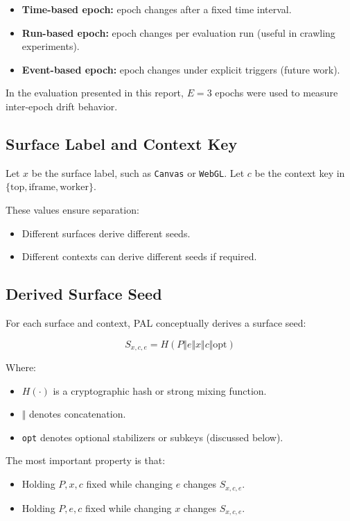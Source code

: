\documentclass[11pt]{report}
\begin{document}
\begin{itemize}
    \item \textbf{Time-based epoch:} epoch changes after a fixed time interval.
    \item \textbf{Run-based epoch:} epoch changes per evaluation run (useful in crawling experiments).
    \item \textbf{Event-based epoch:} epoch changes under explicit triggers (future work).
\end{itemize}

In the evaluation presented in this report, $E=3$ epochs were used to measure inter-epoch drift behavior.

\subsection{Surface Label and Context Key}

Let $x$ be the surface label, such as \texttt{Canvas} or \texttt{WebGL}. Let $c$ be the context key in $\{\text{top},\text{iframe},\text{worker}\}$.

These values ensure separation:
\begin{itemize}
    \item Different surfaces derive different seeds.
    \item Different contexts can derive different seeds if required.
\end{itemize}

\subsection{Derived Surface Seed}

For each surface and context, PAL conceptually derives a surface seed:

\[
S_{x,c,e} = H\left(P \Vert e \Vert x \Vert c \Vert \text{opt}\right)
\]

Where:
\begin{itemize}
    \item $H(\cdot)$ is a cryptographic hash or strong mixing function.
    \item $\Vert$ denotes concatenation.
    \item \texttt{opt} denotes optional stabilizers or subkeys (discussed below).
\end{itemize}

The most important property is that:
\begin{itemize}
    \item Holding $P, x, c$ fixed while changing $e$ changes $S_{x,c,e}$.
    \item Holding $P, e, c$ fixed while changing $x$ changes $S_{x,c,e}$.
\end{itemize}
\end{document}
